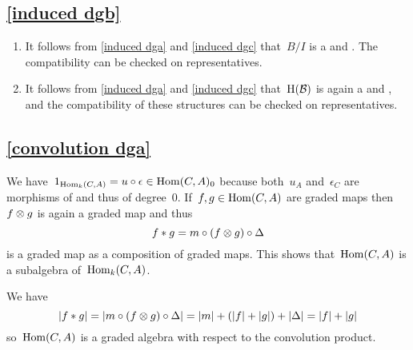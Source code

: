 \subsection{\cref{induced dgb}}
\label{induced dgb proof}

\begin{enumerate}
  \item
    It follows from \cref{induced dga} and \cref{induced dgc} that~$B/I$ is a {\dga} and {\dgc}.
    The compatibility can be checked on representatives.
  \item
    It follows from \cref{induced dga} and \cref{induced dgc} that~$\operatorname{H}(\mathcal{B})$ is again a {\dga} and {\dgc}, and the compatibility of these structures can be checked on representatives.
\end{enumerate}


\subsection{\cref{convolution dga}}
\label{convolution dga proof}

We have~$1_{\operatorname{Hom}_k(C,A)} = u \circ \epsilon \in \operatorname{Hom}(C,A)_0$ because both~$u_A$ and~$\epsilon_C$ are morphisms of {\dgvs} and thus of degree~$0$.
If~$f, g \in \operatorname{Hom}(C,A)$ are graded maps then~$f \otimes g$ is again a graded map and thus
\[
  f * g
  =
  m \circ (f \otimes g) \circ \Delta
\]
is a graded map as a composition of graded maps.
This shows that~$\operatorname{Hom}(C,A)$ is a subalgebra of~$\operatorname{Hom}_k(C,A)$.

We have
\[
  \lvert f * g\rvert
  =
  \lvert m \circ (f \otimes g) \circ \Delta\rvert
  =
  \lvert m\rvert + (\lvert f\rvert + \lvert g\rvert) + \lvert\Delta\rvert
  =
  \lvert f\rvert + \lvert g\rvert
\]
so~$\operatorname{Hom}(C,A)$ is a graded algebra with respect to the convolution product.

